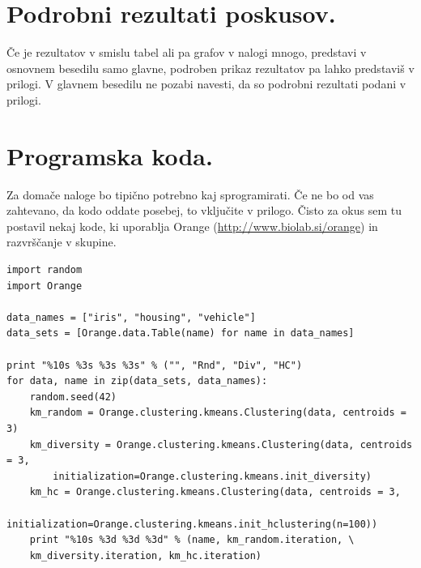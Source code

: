 \documentclass[a4paper,11pt]{article}
\begin{document}
\appendix
\appendixpage
\section{\label{app-res}Podrobni rezultati poskusov.}

Če je rezultatov v smislu tabel ali pa grafov v nalogi mnogo,
predstavi v osnovnem besedilu samo glavne, podroben prikaz
rezultatov pa lahko predstaviš v prilogi. V glavnem besedilu ne
pozabi navesti, da so podrobni rezultati podani v prilogi.

\section{\label{app-code}Programska koda.}

Za domače naloge bo tipično potrebno kaj sprogramirati. Če ne bo od
vas zahtevano, da kodo oddate posebej, to vključite v prilogo. Čisto
za okus sem tu postavil nekaj kode, ki uporablja Orange
(\url{http://www.biolab.si/orange}) in razvrščanje v skupine.


\begin{lstlisting}
import random
import Orange

data_names = ["iris", "housing", "vehicle"]
data_sets = [Orange.data.Table(name) for name in data_names]

print "%10s %3s %3s %3s" % ("", "Rnd", "Div", "HC")
for data, name in zip(data_sets, data_names):
    random.seed(42)
    km_random = Orange.clustering.kmeans.Clustering(data, centroids = 3)
    km_diversity = Orange.clustering.kmeans.Clustering(data, centroids = 3,
        initialization=Orange.clustering.kmeans.init_diversity)
    km_hc = Orange.clustering.kmeans.Clustering(data, centroids = 3,
        initialization=Orange.clustering.kmeans.init_hclustering(n=100))
    print "%10s %3d %3d %3d" % (name, km_random.iteration, \
    km_diversity.iteration, km_hc.iteration)
\end{lstlisting}
\end{document}
